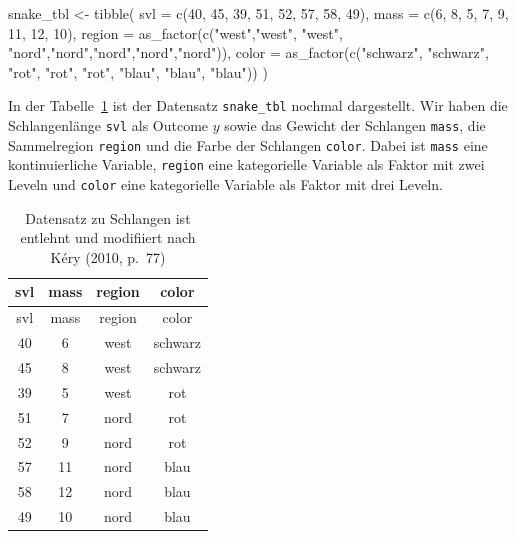 \documentclass[
  letterpaper,
]{scrbook}
\newenvironment{Shaded}{\begin{snugshade}}{\end{snugshade}}
\newcommand{\AttributeTok}[1]{\textcolor[rgb]{0.40,0.45,0.13}{#1}}
\newcommand{\DecValTok}[1]{\textcolor[rgb]{0.68,0.00,0.00}{#1}}
\newcommand{\FunctionTok}[1]{\textcolor[rgb]{0.28,0.35,0.67}{#1}}
\newcommand{\NormalTok}[1]{\textcolor[rgb]{0.00,0.23,0.31}{#1}}
\newcommand{\OtherTok}[1]{\textcolor[rgb]{0.00,0.23,0.31}{#1}}
\newcommand{\StringTok}[1]{\textcolor[rgb]{0.13,0.47,0.30}{#1}}
\begin{document}
\begin{Shaded}
\begin{Highlighting}[]
\NormalTok{snake\_tbl }\OtherTok{\textless{}{-}} \FunctionTok{tibble}\NormalTok{(}
  \AttributeTok{svl =} \FunctionTok{c}\NormalTok{(}\DecValTok{40}\NormalTok{, }\DecValTok{45}\NormalTok{, }\DecValTok{39}\NormalTok{, }\DecValTok{51}\NormalTok{, }\DecValTok{52}\NormalTok{, }\DecValTok{57}\NormalTok{, }\DecValTok{58}\NormalTok{, }\DecValTok{49}\NormalTok{),}
  \AttributeTok{mass =} \FunctionTok{c}\NormalTok{(}\DecValTok{6}\NormalTok{, }\DecValTok{8}\NormalTok{, }\DecValTok{5}\NormalTok{, }\DecValTok{7}\NormalTok{, }\DecValTok{9}\NormalTok{, }\DecValTok{11}\NormalTok{, }\DecValTok{12}\NormalTok{, }\DecValTok{10}\NormalTok{),}
  \AttributeTok{region =} \FunctionTok{as\_factor}\NormalTok{(}\FunctionTok{c}\NormalTok{(}\StringTok{"west"}\NormalTok{,}\StringTok{"west"}\NormalTok{, }\StringTok{"west"}\NormalTok{, }\StringTok{"nord"}\NormalTok{,}\StringTok{"nord"}\NormalTok{,}\StringTok{"nord"}\NormalTok{,}\StringTok{"nord"}\NormalTok{,}\StringTok{"nord"}\NormalTok{)),}
  \AttributeTok{color =} \FunctionTok{as\_factor}\NormalTok{(}\FunctionTok{c}\NormalTok{(}\StringTok{"schwarz"}\NormalTok{, }\StringTok{"schwarz"}\NormalTok{, }\StringTok{"rot"}\NormalTok{, }\StringTok{"rot"}\NormalTok{, }\StringTok{"rot"}\NormalTok{, }\StringTok{"blau"}\NormalTok{, }\StringTok{"blau"}\NormalTok{, }\StringTok{"blau"}\NormalTok{))}
\NormalTok{) }
\end{Highlighting}
\end{Shaded}

In der Tabelle~\ref{tbl-snakes} ist der Datensatz \texttt{snake\_tbl}
nochmal dargestellt. Wir haben die Schlangenlänge \texttt{svl} als
Outcome \(y\) sowie das Gewicht der Schlangen \texttt{mass}, die
Sammelregion \texttt{region} und die Farbe der Schlangen \texttt{color}.
Dabei ist \texttt{mass} eine kontinuierliche Variable, \texttt{region}
eine kategorielle Variable als Faktor mit zwei Leveln und \texttt{color}
eine kategorielle Variable als Faktor mit drei Leveln.

\hypertarget{tbl-snakes}{}
\begin{longtable}[]{@{}cccc@{}}
\caption{\label{tbl-snakes}Datensatz zu Schlangen ist entlehnt und
modifiiert nach Kéry (2010, p.~77)}\tabularnewline
\toprule()
svl & mass & region & color \\
\midrule()
\endfirsthead
\toprule()
svl & mass & region & color \\
\midrule()
\endhead
40 & 6 & west & schwarz \\
45 & 8 & west & schwarz \\
39 & 5 & west & rot \\
51 & 7 & nord & rot \\
52 & 9 & nord & rot \\
57 & 11 & nord & blau \\
58 & 12 & nord & blau \\
49 & 10 & nord & blau \\
\bottomrule()
\end{longtable}
\end{document}
